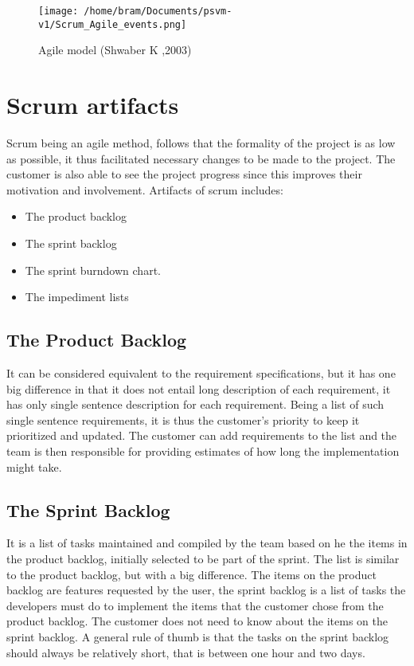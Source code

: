 \documentclass[a4paper, 12pt]{report}
\begin{document}
\begin{figure}[h]
\centering
  \texttt{[image: /home/bram/Documents/psvm-v1/Scrum\_Agile\_events.png]}
  \caption{Agile model (Shwaber K ,2003)}
  \label{fig:agile model}
\end{figure}

\section{Scrum artifacts}
\noindent Scrum being an agile method, follows that the formality of the project is as low as possible, it
thus facilitated necessary changes to be made to the project. The customer is also able to see the
project progress since this improves their motivation and involvement. Artifacts of scrum
includes:
\begin{itemize}
\item The product backlog
\item The sprint backlog
\item The sprint burndown chart.
\item The impediment lists

\end{itemize}
\subsection{The Product Backlog} 
It can be considered equivalent to the requirement specifications, but it has one big difference in
that it does not entail long description of each requirement, it has only single sentence
description for each requirement. Being a list of such single sentence requirements, it is thus the
customer’s priority to keep it prioritized and updated. The customer can add requirements to the
list and the team is then responsible for providing estimates of how long the implementation
might take.

\subsection{The Sprint Backlog} 
It is a list of tasks maintained and compiled by the team based on he the items in the product
backlog, initially selected to be part of the sprint. The list is similar to the product backlog, but
with a big difference. The items on the product backlog are features requested by the user, the
sprint backlog is a list of tasks the developers must do to implement the items that the customer
chose from the product backlog. The customer does not need to know about the items on the
sprint backlog.
A general rule of thumb is that the tasks on the sprint backlog should always be relatively short,
that is between one hour and two days.
\end{document}
